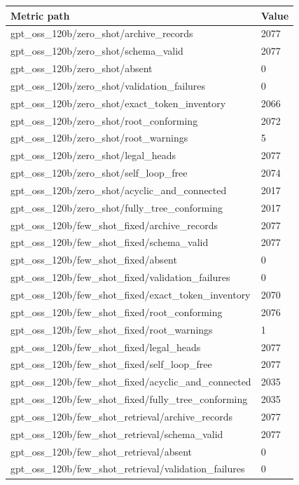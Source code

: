 \begin{tabular}{ll}
\hline
Metric path & Value \\
\hline
gpt\_oss\_120b/zero\_shot/archive\_records & 2077 \\
gpt\_oss\_120b/zero\_shot/schema\_valid & 2077 \\
gpt\_oss\_120b/zero\_shot/absent & 0 \\
gpt\_oss\_120b/zero\_shot/validation\_failures & 0 \\
gpt\_oss\_120b/zero\_shot/exact\_token\_inventory & 2066 \\
gpt\_oss\_120b/zero\_shot/root\_conforming & 2072 \\
gpt\_oss\_120b/zero\_shot/root\_warnings & 5 \\
gpt\_oss\_120b/zero\_shot/legal\_heads & 2077 \\
gpt\_oss\_120b/zero\_shot/self\_loop\_free & 2074 \\
gpt\_oss\_120b/zero\_shot/acyclic\_and\_connected & 2017 \\
gpt\_oss\_120b/zero\_shot/fully\_tree\_conforming & 2017 \\
gpt\_oss\_120b/few\_shot\_fixed/archive\_records & 2077 \\
gpt\_oss\_120b/few\_shot\_fixed/schema\_valid & 2077 \\
gpt\_oss\_120b/few\_shot\_fixed/absent & 0 \\
gpt\_oss\_120b/few\_shot\_fixed/validation\_failures & 0 \\
gpt\_oss\_120b/few\_shot\_fixed/exact\_token\_inventory & 2070 \\
gpt\_oss\_120b/few\_shot\_fixed/root\_conforming & 2076 \\
gpt\_oss\_120b/few\_shot\_fixed/root\_warnings & 1 \\
gpt\_oss\_120b/few\_shot\_fixed/legal\_heads & 2077 \\
gpt\_oss\_120b/few\_shot\_fixed/self\_loop\_free & 2077 \\
gpt\_oss\_120b/few\_shot\_fixed/acyclic\_and\_connected & 2035 \\
gpt\_oss\_120b/few\_shot\_fixed/fully\_tree\_conforming & 2035 \\
gpt\_oss\_120b/few\_shot\_retrieval/archive\_records & 2077 \\
gpt\_oss\_120b/few\_shot\_retrieval/schema\_valid & 2077 \\
gpt\_oss\_120b/few\_shot\_retrieval/absent & 0 \\
gpt\_oss\_120b/few\_shot\_retrieval/validation\_failures & 0 \\

\end{tabular}
